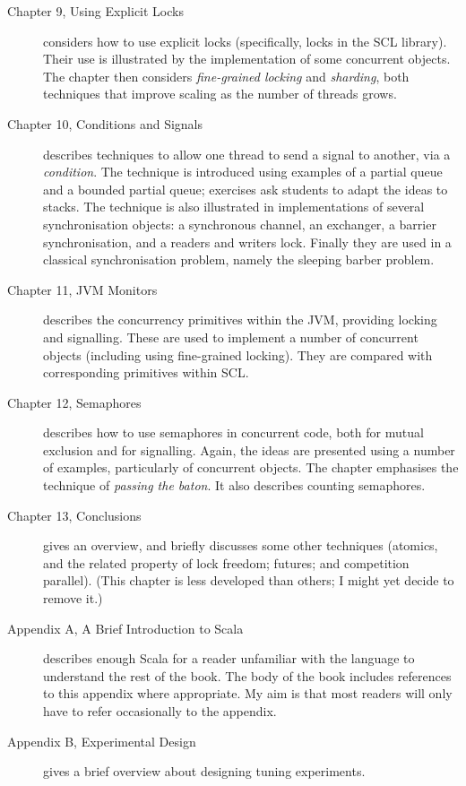\documentclass[12pt,a4paper]{article}
\begin{document}
\begin{description}
\item[Chapter 9, Using Explicit Locks] considers how to use explicit locks
  (specifically, locks in the SCL library).  Their use is illustrated by the
  implementation of some concurrent objects.  The chapter then considers
  \emph{fine-grained locking} and \emph{sharding}, both techniques that 
  improve scaling as the number of threads grows.

\item[Chapter 10, Conditions and Signals] describes techniques to allow one
  thread to send a signal to another, via a \emph{condition}.  The technique
  is introduced using examples of a partial queue and a bounded partial queue;
  exercises ask students to adapt the ideas to stacks.  The technique is also
  illustrated in implementations of several synchronisation objects: a
  synchronous channel, an exchanger,  a barrier synchronisation, and a readers
  and writers lock.  Finally they are used in a classical synchronisation
  problem, namely the sleeping barber problem. 

\item[Chapter 11, JVM Monitors] describes the concurrency primitives within
  the JVM, providing locking and signalling.  These are used to implement a
  number of concurrent objects (including using fine-grained locking).  They
  are compared with corresponding primitives within SCL.

\item[Chapter 12, Semaphores] describes how to use semaphores in concurrent
  code, both for mutual exclusion and for signalling.  Again, the ideas are
  presented using a number of examples, particularly of concurrent objects.
  The chapter emphasises the technique of \emph{passing the baton}.  It also
  describes counting semaphores.

\item[Chapter 13, Conclusions] gives an overview, and briefly discusses some
  other techniques (atomics, and the related property of lock freedom;
  futures; and competition parallel).  (This chapter is less developed than
  others;  I might yet decide to remove it.) 

\item[Appendix A, A Brief Introduction to Scala] describes enough Scala for a
  reader unfamiliar with the language to understand the rest of the book.  The
  body of the book includes references to this appendix where appropriate.  My
  aim is that most readers will only have to refer occasionally to the
  appendix. 

\item[Appendix B, Experimental Design] gives a brief overview about designing
  tuning experiments.  
\end{description}
\end{document}
